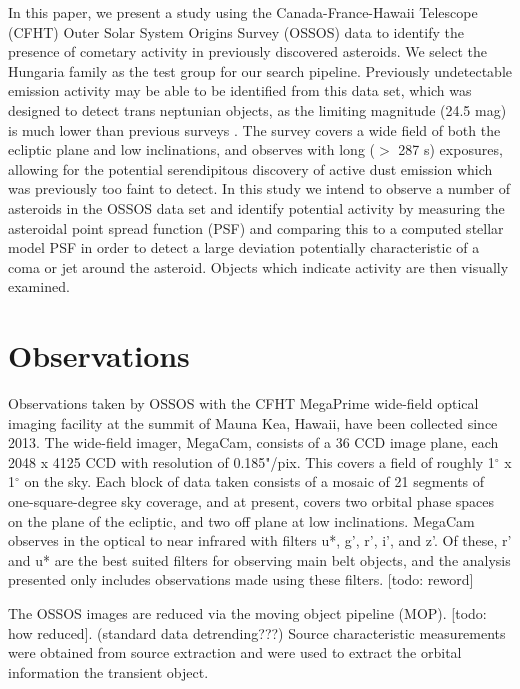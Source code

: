 \documentclass[iop,apj]{emulateapj}
\begin{document}
In this paper, we present a study using the Canada-France-Hawaii Telescope (CFHT) Outer Solar System Origins Survey (OSSOS) data to identify the presence of cometary activity in previously discovered asteroids. We select the Hungaria family as the test group for our search pipeline. Previously undetectable emission activity may be able to be identified from this data set, which was designed to detect trans neptunian objects, as the limiting magnitude (24.5 mag) is much lower than previous surveys \cite{hsieh15}. The survey covers a wide field of both the ecliptic plane and low inclinations, and observes with long ($>$ 287 s) exposures, allowing for the potential serendipitous discovery of active dust emission which was previously too faint to detect. In this study we intend to observe a number of asteroids in the OSSOS data set and identify potential activity by measuring the asteroidal point spread function (PSF) and comparing this to a computed stellar model PSF in order to detect a large deviation potentially characteristic of a coma or jet around the asteroid. Objects which indicate activity are then visually examined. 



\section{Observations}

Observations taken by OSSOS with the CFHT MegaPrime wide-field optical imaging facility  at the summit of Mauna Kea, Hawaii, have been collected since 2013. The wide-field imager, MegaCam, consists of a 36 CCD image plane, each 2048 x 4125 CCD with resolution of 0.185"/pix. This covers a field of  roughly 1$^{\circ}$ x 1$^{\circ}$ on the sky. Each block of data taken consists of a mosaic of 21 segments of one-square-degree sky coverage, and at present, covers two orbital phase spaces on the plane of the ecliptic, and two off plane at low inclinations. MegaCam observes in the optical to near infrared with filters u*, g', r', i', and z'. Of these, r' and u* are the best suited filters for observing main belt objects, and the analysis presented only includes observations made using these filters. [todo: reword]

The OSSOS images are reduced via the moving object pipeline (MOP). [todo: how reduced]. (standard data detrending???) Source characteristic measurements were obtained from source extraction \citep{sep} and were used to extract the orbital information the transient object. 
\end{document}
